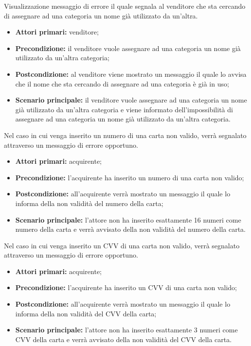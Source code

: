 Visualizzazione messaggio di errore il quale segnala al venditore che sta cercando di assegnare ad una categoria un nome già utilizzato da un'altra.
\begin{itemize}
    \item \textbf{Attori primari:} venditore;
    \item \textbf{Precondizione:} il venditore vuole assegnare ad una categoria un nome già utilizzato da un'altra categoria;
    \item \textbf{Postcondizione:} al venditore viene mostrato un messaggio il quale lo avvisa che il nome che sta cercando di assegnare ad una categoria è già in uso;
    \item \textbf{Scenario principale:} il venditore vuole assegnare ad una categoria un nome già utilizzato da un'altra categoria e viene informato dell'impossibilità di assegnare ad una categoria un nome già utilizzato da un'altra categoria.
\end{itemize}

Nel caso in cui venga inserito un numero di una carta non valido, verrà segnalato attraverso un messaggio di errore opportuno.
\begin{itemize}
	\item \textbf{Attori primari:} acquirente;
	\item \textbf{Precondizione:} l'acquirente ha inserito un numero di una carta non valido;
	\item \textbf{Postcondizione:} all'acquirente verrà mostrato un messaggio il quale lo informa della non validità del numero della carta;
	\item \textbf{Scenario principale:} l'attore non ha inserito esattamente 16 numeri come numero della carta e verrà avvisato della non validità del numero della carta.
\end{itemize}

Nel caso in cui venga inserito un CVV di una carta non valido, verrà segnalato attraverso un messaggio di errore opportuno.
\begin{itemize}
	\item \textbf{Attori primari:} acquirente;
	\item \textbf{Precondizione:} l'acquirente ha inserito un CVV di una carta non valido;
	\item \textbf{Postcondizione:} all'acquirente verrà mostrato un messaggio il quale lo informa della non validità del CVV della carta;
	\item \textbf{Scenario principale:} l'attore non ha inserito esattamente 3 numeri come CVV della carta e verrà avvisato della non validità del CVV della carta.
\end{itemize}

